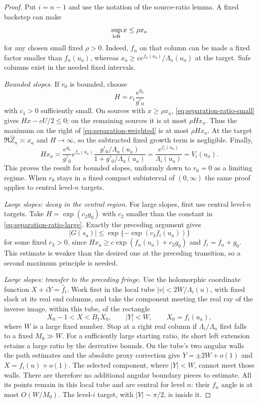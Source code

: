 \begin{proof}
Put $i=n-1$ and use the notation of the source-ratio lemma.
A fixed backstep can make
\begin{equation}\label{eq:separation-left-small}
 \sup_{\rm left}x\leq\rho x_a
\end{equation}
for any chosen small fixed $\rho>0$.
Indeed, $f_n$ on that column can be made a fixed factor smaller
than $f_n(u_a)$, whereas
$x_a\geq c e^{f_n(u_a)}/\Lambda_n(u_a)$ at the target.
Safe columns exist in the needed fixed intervals.

\emph{Bounded slopes.}
If $r_0$ is bounded, choose
\[
 H=c_1\frac{e^{g_0}}{g'_0}
\]
with $c_1>0$ sufficiently small.  On sources with
$x\geq\rho x_a$, \eqref{eq:separation-ratio-small} gives
$Hx-cU/2\leq0$; on the remaining sources it is at most
$\rho Hx_a$.  Thus the maximum on the right of
\eqref{eq:separation-weighted} is at most $\rho Hx_a$.
At the target $\Re\widehat Z_n\asymp x_a$ and $H\to\infty$,
so the subtracted fixed growth term is negligible.  Finally,
\begin{equation}\label{eq:separation-bounded-slope-scale}
 Hx_a\asymp
 \frac{e^{g_0}}{g'_0}e^{f_n(u_a)}
        \frac{g'_0/\Lambda_n(u_a)}{1+g'_0/\Lambda_n(u_a)}
 =\frac{e^{f_i(u_a)}}{\Lambda_i(u_a)}=V_i(u_a).
\end{equation}
This proves the result for bounded slopes, uniformly down to
$r_0=0$ as a limiting regime.  When $r_0$ stays in a fixed
compact subinterval of $(0,\infty)$ the same proof applies
to central level-$n$ targets.

\emph{Large slopes: decay in the central region.}
For large slopes, first use central level-$n$ targets.
Take $H=\exp(c_2g_0)$ with $c_2$ smaller than the constant
in \eqref{eq:separation-ratio-large}.  Exactly the preceding
argument gives
\begin{equation}\label{eq:separation-central-large}
 |G(s_a)|\leq
       \exp\{-\exp(c_3 f_i(u_a))\}
\end{equation}
for some fixed $c_3>0$, since
$Hx_a\geq c\exp(f_n(u_a)+c_2g_0)$ and
$f_i=f_n+g_0$.  This estimate is weaker than the desired one
at the preceding transition, so a second maximum principle is
needed.

\emph{Large slopes: transfer to the preceding fringe.}
Use the holomorphic coordinate function
$X+iY=\widehat f_i$.  Work first in the local tube
$|v|<2W/\Lambda_i(u)$, with fixed slack at its real end columns,
and take the component meeting the real ray of the inverse
image, within this tube, of the rectangle
\[
 X_0-1<X<B_1X_0,\qquad |Y|<W,
 \qquad X_0=f_i(u_a),
\]
where $W$ is a large fixed number.  Stop at a right real column
if $\Lambda_i/\Lambda_n$ first falls to a fixed
$M_0\gg W$.  For a sufficiently large starting ratio, its
short left extension retains a large ratio by the derivative
bounds.  On the tube's two angular walls the path estimates and
the absolute proxy correction give
$Y=\pm2W+o(1)$ and $X=f_i(u)+o(1)$.
The selected component, where $|Y|<W$, cannot meet those walls.
There are therefore no additional angular boundary pieces to
estimate.  All its points remain in this local tube and are
central for level $n$: their $f_n$ angle is at most
$O(W/M_0)$.
The level-$i$ target, with $|Y|\sim\pi/2$, is inside it.


\end{proof}
